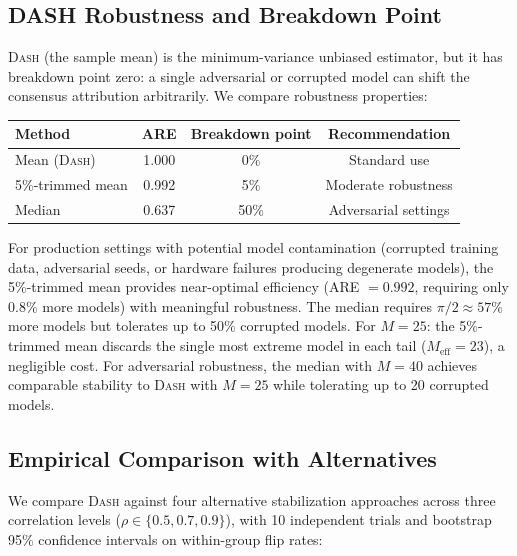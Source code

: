 \documentclass{jmlr}
\newcommand{\DASH}{\textsc{Dash}}
\begin{document}
\subsection{DASH Robustness and Breakdown Point}
\label{sec:dash-robustness}

\DASH{} (the sample mean) is the minimum-variance unbiased estimator, but it has breakdown point zero: a single adversarial or corrupted model can shift the consensus attribution arbitrarily. We compare robustness properties:

\begin{center}
\small
\begin{tabular}{@{}lccc@{}}
\toprule
Method & ARE & Breakdown point & Recommendation \\
\midrule
Mean (\DASH{}) & 1.000 & 0\% & Standard use \\
5\%-trimmed mean & 0.992 & 5\% & Moderate robustness \\
Median & 0.637 & 50\% & Adversarial settings \\
\bottomrule
\end{tabular}
\end{center}

For production settings with potential model contamination (corrupted training data, adversarial seeds, or hardware failures producing degenerate models), the 5\%-trimmed mean provides near-optimal efficiency (ARE $= 0.992$, requiring only $0.8\%$ more models) with meaningful robustness. The median requires $\pi/2 \approx 57\%$ more models but tolerates up to 50\% corrupted models. For $M = 25$: the 5\%-trimmed mean discards the single most extreme model in each tail ($M_{\text{eff}} = 23$), a negligible cost. For adversarial robustness, the median with $M = 40$ achieves comparable stability to \DASH{} with $M = 25$ while tolerating up to 20 corrupted models.

\subsection{Empirical Comparison with Alternatives}
\label{sec:dash-benchmark}

We compare \DASH{} against four alternative stabilization approaches across three correlation levels ($\rho \in \{0.5, 0.7, 0.9\}$), with 10 independent trials and bootstrap 95\% confidence intervals on within-group flip rates:
\end{document}
